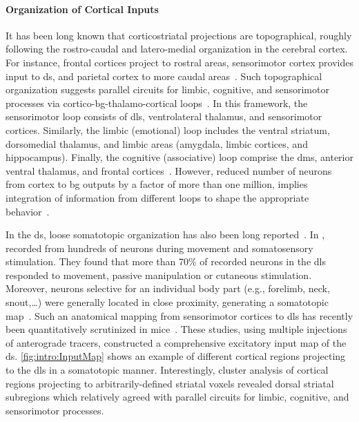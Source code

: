\paragraph{Organization of Cortical Inputs}
It has been long known that corticostriatal projections are topographical, roughly following the rostro-caudal and latero-medial organization in the cerebral cortex.
For instance, frontal cortices project to rostral areas, sensorimotor cortex provides input to \gls{ds}, and parietal cortex to more caudal areas~\cite{Dudman2015Book}.
Such topographical organization suggests parallel circuits for limbic, cognitive, and sensorimotor processes via cortico-\gls{bg}-thalamo-cortical loops~\cite{Alexander1986}.
In this framework, the sensorimotor loop consists of \gls{dls}, ventrolateral thalamus, and sensorimotor cortices.
Similarly, the limbic (emotional) loop includes the ventral striatum, dorsomedial thalamus, and limbic areas (amygdala, limbic cortices, and hippocampus).
Finally, the cognitive (associative) loop comprise the \gls{dms}, anterior ventral thalamus, and frontal cortices~\cite{Jahanshahi2015NatRevNeurosci}.
However, reduced number of neurons from cortex to \gls{bg} outputs by a factor of more than one million, implies integration of information from different loops to shape the appropriate behavior~\cite{Boraud2018ProgNeurobiol}.
\par
In the \gls{ds}, loose somatotopic organization has also been long reported~\cite[see][as an early review]{Mink1996}.
In \citeyear{Carelli1991}, \citeauthor{Carelli1991} recorded from hundreds of neurons during movement and somatosensory stimulation.
They found that more than 70\% of recorded neurons in the \gls{dls} responded to movement, passive manipulation or cutaneous stimulation.
Moreover, neurons selective for an individual body part (e.g., forelimb, neck, snout,\dots) were generally located in close proximity, generating a somatotopic map~\cite{Carelli1991}.
Such an anatomical mapping from sensorimotor cortices to \gls{dls} has recently been quantitatively scrutinized in mice~\cite{Hunnicutt2016, Hintiryan2016NN}.
These studies, using multiple injections of anterograde tracers, constructed a comprehensive excitatory input map of the \gls{ds}.
\autoref{fig:intro:InputMap} shows an example of different cortical regions projecting to the \gls{dls} in a somatotopic manner.
Interestingly, cluster analysis of cortical regions projecting to arbitrarily-defined striatal voxels revealed dorsal striatal subregions which relatively agreed with parallel circuits for limbic, cognitive, and sensorimotor processes.
